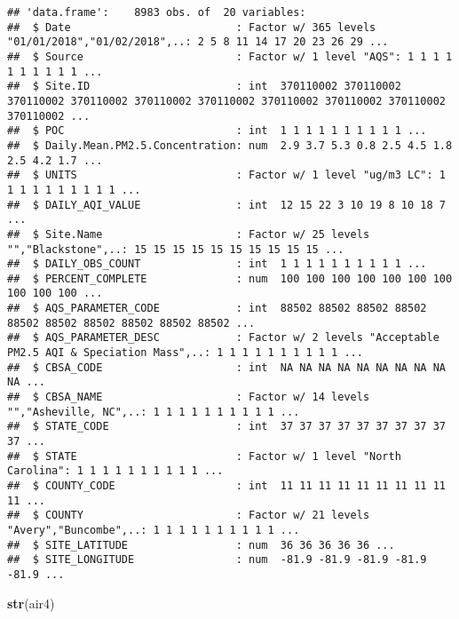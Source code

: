 \documentclass[]{article}
\newenvironment{Shaded}{\begin{snugshade}}{\end{snugshade}}
\newcommand{\KeywordTok}[1]{\textcolor[rgb]{0.13,0.29,0.53}{\textbf{#1}}}
\newcommand{\NormalTok}[1]{#1}
\begin{document}
\begin{verbatim}
## 'data.frame':    8983 obs. of  20 variables:
##  $ Date                          : Factor w/ 365 levels "01/01/2018","01/02/2018",..: 2 5 8 11 14 17 20 23 26 29 ...
##  $ Source                        : Factor w/ 1 level "AQS": 1 1 1 1 1 1 1 1 1 1 ...
##  $ Site.ID                       : int  370110002 370110002 370110002 370110002 370110002 370110002 370110002 370110002 370110002 370110002 ...
##  $ POC                           : int  1 1 1 1 1 1 1 1 1 1 ...
##  $ Daily.Mean.PM2.5.Concentration: num  2.9 3.7 5.3 0.8 2.5 4.5 1.8 2.5 4.2 1.7 ...
##  $ UNITS                         : Factor w/ 1 level "ug/m3 LC": 1 1 1 1 1 1 1 1 1 1 ...
##  $ DAILY_AQI_VALUE               : int  12 15 22 3 10 19 8 10 18 7 ...
##  $ Site.Name                     : Factor w/ 25 levels "","Blackstone",..: 15 15 15 15 15 15 15 15 15 15 ...
##  $ DAILY_OBS_COUNT               : int  1 1 1 1 1 1 1 1 1 1 ...
##  $ PERCENT_COMPLETE              : num  100 100 100 100 100 100 100 100 100 100 ...
##  $ AQS_PARAMETER_CODE            : int  88502 88502 88502 88502 88502 88502 88502 88502 88502 88502 ...
##  $ AQS_PARAMETER_DESC            : Factor w/ 2 levels "Acceptable PM2.5 AQI & Speciation Mass",..: 1 1 1 1 1 1 1 1 1 1 ...
##  $ CBSA_CODE                     : int  NA NA NA NA NA NA NA NA NA NA ...
##  $ CBSA_NAME                     : Factor w/ 14 levels "","Asheville, NC",..: 1 1 1 1 1 1 1 1 1 1 ...
##  $ STATE_CODE                    : int  37 37 37 37 37 37 37 37 37 37 ...
##  $ STATE                         : Factor w/ 1 level "North Carolina": 1 1 1 1 1 1 1 1 1 1 ...
##  $ COUNTY_CODE                   : int  11 11 11 11 11 11 11 11 11 11 ...
##  $ COUNTY                        : Factor w/ 21 levels "Avery","Buncombe",..: 1 1 1 1 1 1 1 1 1 1 ...
##  $ SITE_LATITUDE                 : num  36 36 36 36 36 ...
##  $ SITE_LONGITUDE                : num  -81.9 -81.9 -81.9 -81.9 -81.9 ...
\end{verbatim}

\begin{Shaded}
\begin{Highlighting}[]
\KeywordTok{str}\NormalTok{(air4)}
\end{Highlighting}
\end{Shaded}
\end{document}
